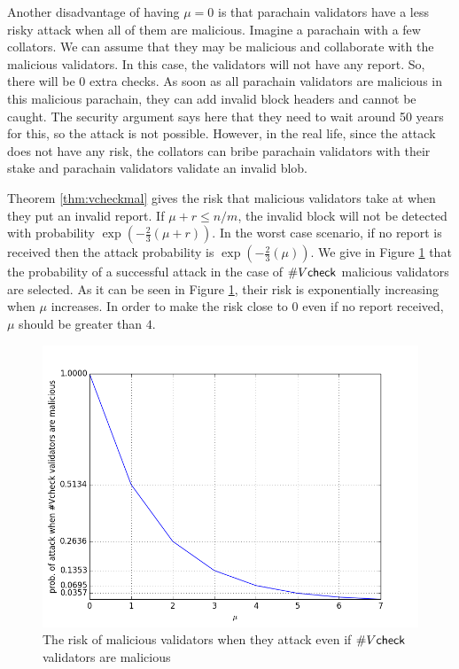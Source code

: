 Another disadvantage of having $\mu = 0$ is that parachain validators have a less risky attack  when all of them are malicious. Imagine a parachain with a few collators. We can assume that they may be malicious and collaborate with the malicious validators. In this case, the validators will not have any report. So, there will be 0 extra checks. As soon as all parachain validators are malicious in this malicious parachain, they can add invalid block headers and cannot be caught. The security argument says here that they need to wait around 50 years for this, so the attack is not possible. However, in the real life, since the attack does not have any risk, the collators can bribe parachain validators with their stake and parachain validators validate an invalid blob.


Theorem \ref{thm:vcheckmal} gives the risk that  malicious validators take at  when they put an invalid report.  If $\mu + r \leq n/m$, the invalid block will not be detected with probability $\exp(-\frac{2}{3}(\mu+r))$. In the worst case scenario, if no report is received then the attack probability is $\exp(-\frac{2}{3}(\mu))$. We give in Figure \ref{fig:mu} that the probability of a successful attack in the case of $\#V\mathsf{check}$ malicious validators are selected. As it can be seen in Figure \ref{fig:mu}, their risk is exponentially increasing when $\mu$ increases. In order to make the risk close to 0 even if no report received, $\mu$ should be greater than $4$.

\begin{figure}[h]\centering
	  \includegraphics[width=12cm]{images/muval.png}
	  \caption{The risk of malicious validators when they attack even if $\#V\mathsf{check}$ validators are malicious}
	  \label{fig:mu}
\end{figure}

